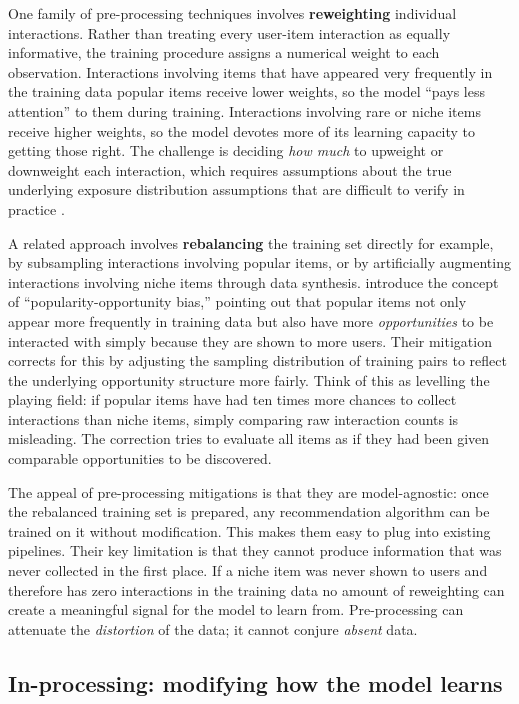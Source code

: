 \documentclass[11pt,a4paper]{report}
\begin{document}
One family of pre-processing techniques involves \textbf{reweighting} individual interactions. Rather than treating every user-item interaction as equally informative, the training procedure assigns a numerical weight to each observation. Interactions involving items that have appeared very frequently in the training data popular items receive lower weights, so the model ``pays less attention'' to them during training. Interactions involving rare or niche items receive higher weights, so the model devotes more of its learning capacity to getting those right. The challenge is deciding \emph{how much} to upweight or downweight each interaction, which requires assumptions about the true underlying exposure distribution assumptions that are difficult to verify in practice \citep{boratto2021connecting}.

A related approach involves \textbf{rebalancing} the training set directly for example, by subsampling interactions involving popular items, or by artificially augmenting interactions involving niche items through data synthesis. \citet{zhu2021opportunitybias} introduce the concept of ``popularity-opportunity bias,'' pointing out that popular items not only appear more frequently in training data but also have more \emph{opportunities} to be interacted with simply because they are shown to more users. Their mitigation corrects for this by adjusting the sampling distribution of training pairs to reflect the underlying opportunity structure more fairly. Think of this as levelling the playing field: if popular items have had ten times more chances to collect interactions than niche items, simply comparing raw interaction counts is misleading. The correction tries to evaluate all items as if they had been given comparable opportunities to be discovered.

The appeal of pre-processing mitigations is that they are model-agnostic: once the rebalanced training set is prepared, any recommendation algorithm can be trained on it without modification. This makes them easy to plug into existing pipelines. Their key limitation is that they cannot produce information that was never collected in the first place. If a niche item was never shown to users and therefore has zero interactions in the training data no amount of reweighting can create a meaningful signal for the model to learn from. Pre-processing can attenuate the \emph{distortion} of the data; it cannot conjure \emph{absent} data.

\subsection*{In-processing: modifying how the model learns}
\end{document}
